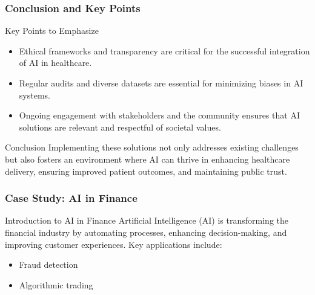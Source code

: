 \documentclass[aspectratio=169]{beamer}
\begin{document}
\begin{frame}[fragile]
    \frametitle{Conclusion and Key Points}
    \begin{block}{Key Points to Emphasize}
        \begin{itemize}
            \item Ethical frameworks and transparency are critical for the successful integration of AI in healthcare.
            \item Regular audits and diverse datasets are essential for minimizing biases in AI systems.
            \item Ongoing engagement with stakeholders and the community ensures that AI solutions are relevant and respectful of societal values.
        \end{itemize}
    \end{block}
    
    \begin{block}{Conclusion}
        Implementing these solutions not only addresses existing challenges but also fosters an environment 
        where AI can thrive in enhancing healthcare delivery, ensuring improved patient outcomes, and maintaining public trust.
    \end{block}
\end{frame}

\begin{frame}[fragile]
    \frametitle{Case Study: AI in Finance}
    \begin{block}{Introduction to AI in Finance}
        Artificial Intelligence (AI) is transforming the financial industry by automating processes, enhancing decision-making, and improving customer experiences.
        Key applications include:
        \begin{itemize}
            \item Fraud detection
            \item Algorithmic trading
        \end{itemize}
    \end{block}
\end{frame}
\end{document}
